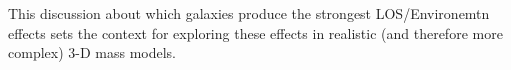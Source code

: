 This discussion about which galaxies produce the strongest LOS/Environemtn effects sets the context for exploring these effects in realistic (and therefore more complex) 3-D mass models.